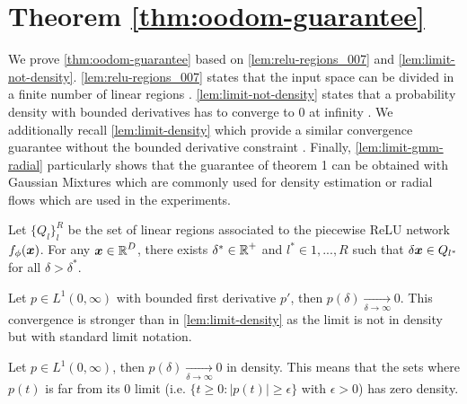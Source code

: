 \section{Theorem \ref{thm:oodom-guarantee}}
\label{sec:proofs_007}

We prove \cref{thm:oodom-guarantee} based on \cref{lem:relu-regions_007} and \cref{lem:limit-not-density}. \cref{lem:relu-regions_007} states that the input space can be divided in a finite number of linear regions \citep{understanding-nn-relu}. \cref{lem:limit-not-density} states that a probability density with bounded derivatives has to converge to $0$ at infinity \citep{limit-existence-infinity}. We additionally recall \cref{lem:limit-density} which provide a similar convergence guarantee without the bounded derivative constraint \citep{integrable-infinity}. Finally, \cref{lem:limit-gmm-radial} particularly shows that the guarantee of theorem 1 can be obtained with Gaussian Mixtures which are commonly used for density estimation or radial flows which are used in the experiments.

\begin{lemma}
\label{lem:relu-regions_007}
\citep{understanding-nn-relu} Let $\{Q_l\}_l^{R}$ be the set of linear regions associated to the piecewise ReLU network $f_{\phi}(\bm{x})$. For any $\bm{x} \in \operatorname{\mathbb{R}}^D$, there exists $\delta^* \in \operatorname{\mathbb{R}}^{+}$ and $l^*\in {1,..., R}$ such that $\delta \bm{x} \in Q_{l^*}$ for all $\delta > \delta^*$.
\end{lemma}

\begin{lemma}
\label{lem:limit-not-density}
\citep{limit-existence-infinity} Let $p \in L^1(0, \infty)$ with bounded first derivative $p'$, then $p(\delta)\underset{\delta \rightarrow \infty}{\rightarrow} 0$. This convergence is stronger than in \cref{lem:limit-density} as the limit is not in density but with standard limit notation.
\end{lemma}

\begin{lemma}
\label{lem:limit-density}
\citep{integrable-infinity} Let $p \in L^1(0, \infty)$, then $p(\delta)\underset{\delta \rightarrow \infty}{\rightarrow} 0$ in density. This means that the sets where $p(t)$ is far from its $0$ limit (i.e. $\{ t \geq 0: |p(t)| \geq \epsilon \}$ with $\epsilon > 0$) has zero density.
\end{lemma}

